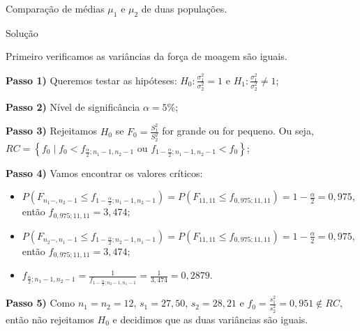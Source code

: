 \documentclass[9pt]{beamer}
\begin{document}
\begin{frame}{Comparação de médias $\mu_1$ e $\mu_2$ de duas populações.}

\small
\begin{block}{Solução}

	Primeiro verificamos as variâncias da força de moagem são iguais.
	
	\textbf{Passo 1)} Queremos testar as hipóteses: $H_0: \frac{\sigma_1^2}{\sigma_2^2} = 1$ e $H_1: \frac{\sigma_1^2}{\sigma_2^2} \neq 1$;
	
	\textbf{Passo 2)} Nível de significância $\alpha=5\%$;
	
	\textbf{Passo 3)} Rejeitamos $H_0$ se $F_0 = \frac{S_1^2}{S_2^2}$ for grande ou for pequeno. Ou seja, $RC = \left\{ f_0 \mid f_0 < f_{\frac{\alpha}{2}; n_1-1, n_2-1} \mbox{ ou } f_{1-\frac{\alpha}{2}; n_1-1, n_2-1} < f_0 \right\}$;
	
	\textbf{Passo 4)} Vamos encontrar os valores críticos:
	\begin{itemize}
		\item $P\left( F_{n_1-, n_2-1}  \leq f_{1-\frac{\alpha}{2}; n_1-1, n_2-1} \right) =  P\left( F_{11, 11}  \leq f_{0,975; 11, 11} \right) = 1 - \frac{\alpha}{2} = 0,975$, então $f_{0,975; 11, 11} = 3,474$;
		\item $P\left( F_{n_2-, n_1-1}  \leq f_{1-\frac{\alpha}{2}; n_2-1, n_1-1} \right) =  P\left( F_{11, 11}  \leq f_{0,975; 11, 11} \right) = 1 - \frac{\alpha}{2} = 0,975$, então $f_{0,975; 11, 11} = 3,474$;
		\item $f_{\frac{\alpha}{2}; n_1-1, n_2-1} = \frac{1}{f_{1-\frac{\alpha}{2}; n_2-1, n_1-1}}=\frac{1}{3,474} = 0,2879$.
	\end{itemize}	

	\textbf{Passo 5)} Como $n_1=n_2=12$, $s_1 = 27,50$, $s_2 = 28,21$ e $f_0 = \frac{s_1^2}{s_2^2} = 0,951 \not\in RC$, então não rejeitamos $H_0$ e decidimos que as duas variâncias são iguais.
\end{block}
\normalsize

\end{frame}
\end{document}

